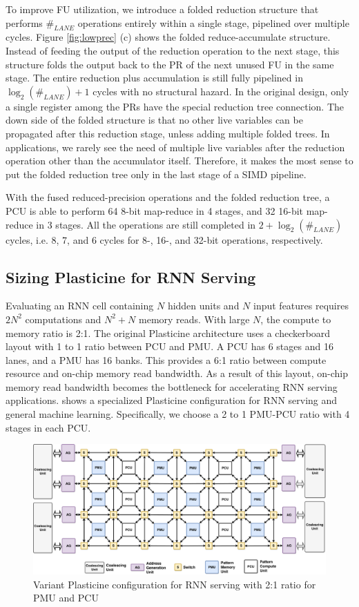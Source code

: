 To improve FU utilization, we introduce a folded reduction structure that performs $\#_{LANE}$
operations entirely within a single stage, pipelined over multiple cycles.
Figure \ref{fig:lowprec} (c) shows the folded reduce-accumulate structure.
Instead of feeding the output of the reduction operation to the next stage, 
this structure folds the output back to the PR of the next unused FU in the 
same stage. 
The entire reduction plus accumulation is still fully pipelined in $\log_2(\#_{LANE})+1$ cycles
with no structural hazard.
In the original design, only a single register among the PRs have the special reduction tree
connection.
The down side of the folded structure is that no other live variables can be propagated after this
reduction stage, unless adding multiple folded trees. 
In applications, we rarely see the need of multiple live variables after the reduction operation
other than the accumulator itself.
Therefore, it makes the most sense to put the
folded reduction tree only in the last stage of a SIMD pipeline.

With the fused reduced-precision operations and the folded reduction tree,
  a PCU is able to perform 64 8-bit map-reduce in 4 stages, and 32 16-bit map-reduce in 3 stages.
All the operations are still completed in $2+\log_2(\#_{LANE})$ cycles, i.e. 
8, 7, and 6 cycles for 8-, 16-, and 32-bit operations, respectively.

\subsection{Sizing Plasticine for RNN Serving} \label{sec:sizing}
Evaluating an RNN cell containing $N$ hidden units and $N$ input features
  requires $2N^2$ computations and $N^2+N$ memory reads.
With large $N$, the compute to memory ratio is 2:1.
The original Plasticine architecture uses a checkerboard layout
  with 1 to 1 ratio between PCU and PMU.
A PCU has 6 stages and 16 lanes, and a PMU has 16 banks.
This provides a 6:1 ratio between
  compute resource and on-chip memory read bandwidth.
As a result of this layout,
  on-chip memory read bandwidth becomes the bottleneck for accelerating RNN serving applications.
 shows a specialized Plasticine configuration for RNN serving and general machine
learning.
Specifically, we choose a 2 to 1 PMU-PCU ratio with 4 stages in each PCU.
\begin{figure}
  \centering
  \includegraphics[width=\textwidth]{figs/rnnarch.pdf}
  \caption[Variant Plasticine configuration for RNN serving]{
    Variant Plasticine configuration for RNN serving with 2:1 ratio for PMU and PCU}
  \label{fig:rnnarch}
\end{figure}
